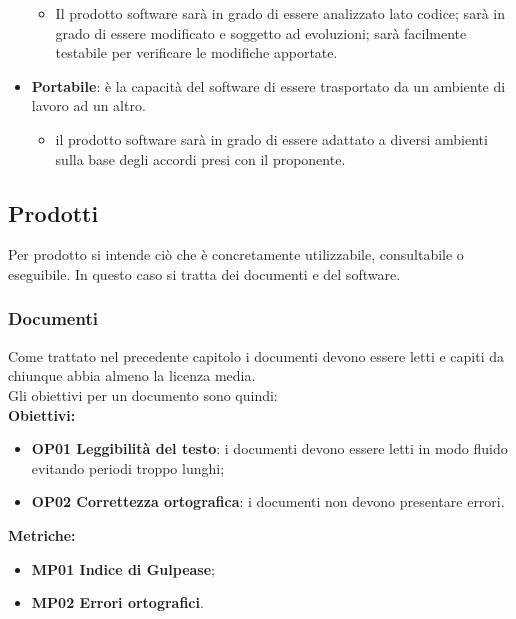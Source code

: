 \documentclass[../piano_di_qualifica.tex]{subfiles}
\begin{document}
\begin{itemize}
	      \begin{itemize}
		      \item Il prodotto software sarà in grado di essere analizzato lato codice; sarà in grado di essere modificato e soggetto ad evoluzioni; sarà facilmente testabile per verificare le modifiche apportate.
	      \end{itemize}
	\item \textbf{Portabile}: è la capacità del software di essere trasportato da un ambiente di lavoro ad un altro.
	      \begin{itemize}
		      \item il prodotto software sarà in grado di essere adattato a diversi ambienti sulla base degli accordi presi con il proponente.
	      \end{itemize}
\end{itemize}

\subsection{Prodotti}
Per prodotto si intende ciò che è concretamente utilizzabile, consultabile o eseguibile. In questo caso si tratta dei documenti e del software.

\subsubsection{Documenti}
Come trattato nel precedente capitolo i documenti devono essere letti e capiti da chiunque abbia almeno la licenza media.\\
Gli obiettivi per un documento sono quindi: \\

\setlength{\parindent}{0pt}\textbf{Obiettivi:}
\smallbreak
\begin{itemize}
	\item \textbf{OP01 Leggibilità del testo}: i documenti devono essere letti in modo fluido evitando periodi troppo lunghi; \\
	\item \textbf{OP02 Correttezza ortografica}: i documenti non devono presentare errori.
\end{itemize}

\textbf{Metriche:}
\smallbreak
\begin{itemize}
	\item \textbf{MP01 Indice di Gulpease};
	\item \textbf{MP02 Errori ortografici}.
\end{itemize}
\end{document}
